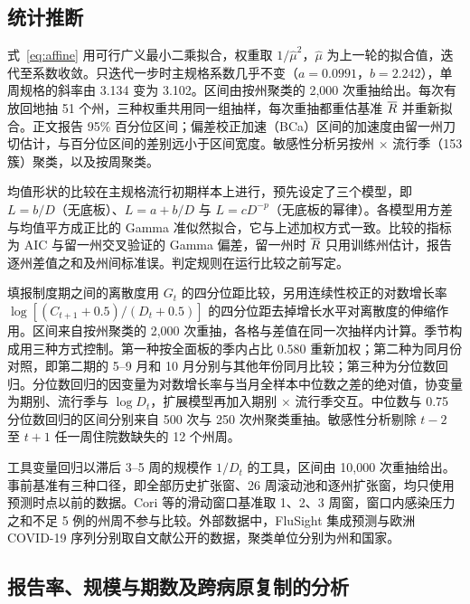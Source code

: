 \subsection{统计推断}
\label{sec:meth-inference}

式~\eqref{eq:affine} 用可行广义最小二乘拟合，权重取 $1/\hat\mu^2$，$\hat\mu$ 为上一轮的拟合值，迭代至系数收敛\citep{wooldridge2010econometric}。只迭代一步时主规格系数几乎不变（$a=0.0991$，$b=2.242$），单周规格的斜率由 3.134 变为 3.102。区间由按州聚类的 2,000 次重抽给出。每次有放回地抽 51 个州，三种权重共用同一组抽样，每次重抽都重估基准 $\overline{R}$ 并重新拟合\citep{cameron2008bootstrap, cameron2015practitioner}。正文报告 95\% 百分位区间；偏差校正加速（BCa）区间\citep{efron1987better}的加速度由留一州刀切估计，与百分位区间的差别远小于区间宽度。敏感性分析另按州 $\times$ 流行季（153 簇）聚类，以及按周聚类。

均值形状的比较在主规格流行初期样本上进行，预先设定了三个模型，即 $L=b/D$（无底板）、$L=a+b/D$ 与 $L=cD^{-p}$（无底板的幂律）。各模型用方差与均值平方成正比的 Gamma 准似然拟合\citep{mccullagh1989generalized}，它与上述加权方式一致。比较的指标为 AIC 与留一州交叉验证的 Gamma 偏差，留一州时 $\overline{R}$ 只用训练州估计，报告逐州差值之和及州间标准误。判定规则在运行比较之前写定。

填报制度期之间的离散度用 $G_t$ 的四分位距比较，另用连续性校正的对数增长率 $\log[(C_{t+1}+0.5)/(D_t+0.5)]$ 的四分位距去掉增长水平对离散度的伸缩作用。区间来自按州聚类的 2,000 次重抽，各格与差值在同一次抽样内计算。季节构成用三种方式控制。第一种按全面板的季内占比 0.580 重新加权；第二种为同月份对照，即第二期的 5--9 月和 10 月分别与其他年份同月比较；第三种为分位数回归\citep{koenker1978regression}。分位数回归的因变量为对数增长率与当月全样本中位数之差的绝对值，协变量为期别、流行季与 $\log D_t$，扩展模型再加入期别 $\times$ 流行季交互。中位数与 0.75 分位数回归的区间分别来自 500 次与 250 次州聚类重抽。敏感性分析剔除 $t-2$ 至 $t+1$ 任一周住院数缺失的 12 个州周。

工具变量回归以滞后 3--5 周的规模作 $1/D_t$ 的工具，区间由 10,000 次重抽给出。事前基准有三种口径，即全部历史扩张窗、26 周滚动池和逐州扩张窗，均只使用预测时点以前的数据。Cori 等\citep{cori2013new}的滑动窗口基准取 1、2、3 周窗，窗口内感染压力之和不足 5 例的州周不参与比较。外部数据中，FluSight 集成预测与欧洲 COVID-19 序列分别取自文献\citep{mathis2024evaluation, flaxman2020estimating}公开的数据，聚类单位分别为州和国家。

\subsection{报告率、规模与期数及跨病原复制的分析}
\label{sec:meth-r3}

